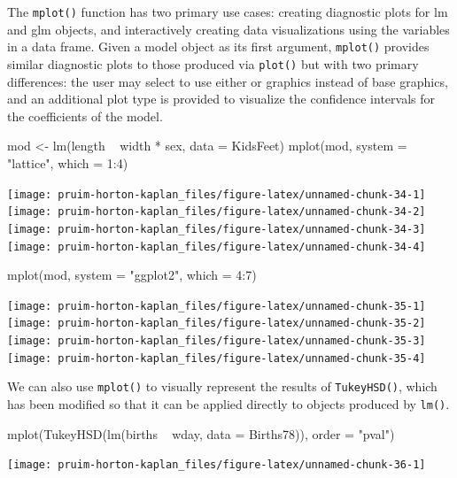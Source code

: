 The \texttt{mplot()} function has two primary use cases: creating
diagnostic plots for lm and glm objects, and interactively creating data
visualizations using the variables in a data frame. Given a model object
as its first argument, \texttt{mplot()} provides similar diagnostic
plots to those produced via \texttt{plot()} but with two primary
differences: the user may select to use either  or
 \citep{ggplot2} graphics instead of base graphics, and
an additional plot type is provided to visualize the confidence
intervals for the coefficients of the model.

\begin{Schunk}
\begin{Sinput}
mod <- lm(length ~ width * sex, data = KidsFeet)
mplot(mod, system = "lattice", which = 1:4)
\end{Sinput}


\begin{center}\texttt{[image: pruim-horton-kaplan\_files/figure-latex/unnamed-chunk-34-1]} \texttt{[image: pruim-horton-kaplan\_files/figure-latex/unnamed-chunk-34-2]} \texttt{[image: pruim-horton-kaplan\_files/figure-latex/unnamed-chunk-34-3]} \texttt{[image: pruim-horton-kaplan\_files/figure-latex/unnamed-chunk-34-4]} \end{center}

\end{Schunk}\begin{Schunk}
\begin{Sinput}
mplot(mod, system = "ggplot2", which = 4:7)
\end{Sinput}


\begin{center}\texttt{[image: pruim-horton-kaplan\_files/figure-latex/unnamed-chunk-35-1]} \texttt{[image: pruim-horton-kaplan\_files/figure-latex/unnamed-chunk-35-2]} \texttt{[image: pruim-horton-kaplan\_files/figure-latex/unnamed-chunk-35-3]} \texttt{[image: pruim-horton-kaplan\_files/figure-latex/unnamed-chunk-35-4]} \end{center}

\end{Schunk}

We can also use \texttt{mplot()} to visually represent the results of
\texttt{TukeyHSD()}, which has been modified so that it can be applied
directly to objects produced by \texttt{lm()}.

\begin{Schunk}
\begin{Sinput}
mplot(TukeyHSD(lm(births ~ wday, data = Births78)), order = "pval")
\end{Sinput}


\begin{center}\texttt{[image: pruim-horton-kaplan\_files/figure-latex/unnamed-chunk-36-1]} \end{center}

\end{Schunk}

